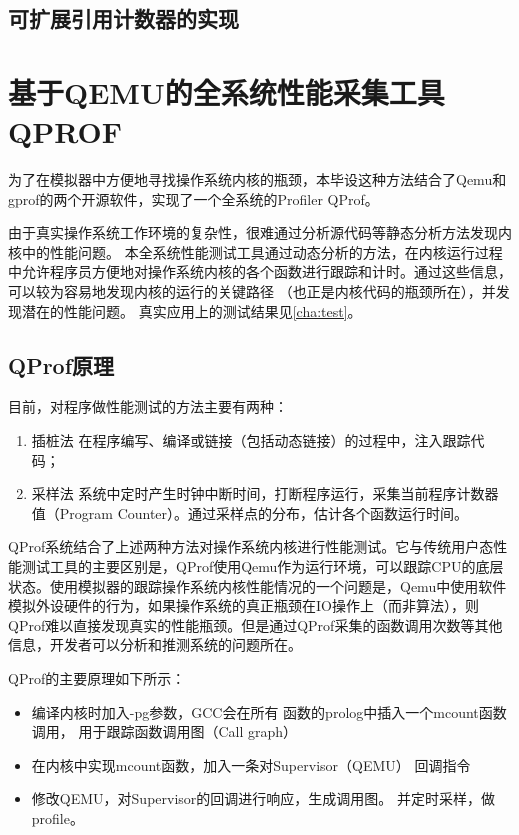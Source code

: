 \subsection{可扩展引用计数器的实现}
\label{subsec:refcache}

\section{基于QEMU的全系统性能采集工具QPROF}
为了在模拟器中方便地寻找操作系统内核的瓶颈，本毕设这种方法结合了Qemu和gprof的两个开源软件，实现了一个全系统的Profiler
 \pozhehao QProf。

由于真实操作系统工作环境的复杂性，很难通过分析源代码等静态分析方法发现内核中的性能问题。
本全系统性能测试工具通过动态分析的方法，在内核运行过程中允许程序员方便地对操作系统内核的各个函数进行跟踪和计时。通过这些信息，可以较为容易地发现内核的运行的关键路径
（也正是内核代码的瓶颈所在），并发现潜在的性能问题。
真实应用上的测试结果见\ref{cha:test}。

\subsection{QProf原理}
	目前，对程序做性能测试的方法主要有两种：
	\begin{enumerate}
		\item {\heiti 插桩法}
			在程序编写、编译或链接（包括动态链接）的过程中，注入跟踪代码；
		\item {\heiti 采样法}
			系统中定时产生时钟中断时间，打断程序运行，采集当前程序计数器值（Program
			Counter）。通过采样点的分布，估计各个函数运行时间。
	\end{enumerate}
	QProf系统结合了上述两种方法对操作系统内核进行性能测试。它与传统用户态性能测试工具的主要区别是，QProf使用Qemu作为运行环境，可以跟踪CPU的底层状态。使用模拟器的跟踪操作系统内核性能情况的一个问题是，Qemu中使用软件模拟外设硬件的行为，如果操作系统的真正瓶颈在IO操作上（而非算法），则QProf难以直接发现真实的性能瓶颈。但是通过QProf采集的函数调用次数等其他信息，开发者可以分析和推测系统的问题所在。

	QProf的主要原理如下所示：
	\begin{itemize}
		\item 编译内核时加入-pg参数，GCC会在所有
			函数的prolog中插入一个mcount函数调用，
			用于跟踪函数调用图（Call graph）
		\item 在内核中实现mcount函数，加入一条对Supervisor（QEMU）
			回调指令
		\item 修改QEMU，对Supervisor的回调进行响应，生成调用图。
			并定时采样，做profile。
	\end{itemize}

